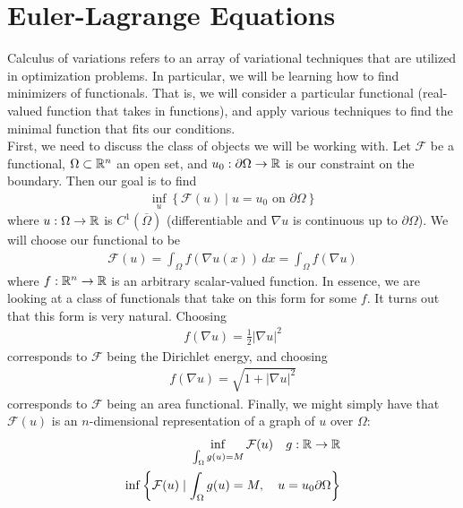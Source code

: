 \documentclass{memoir}
\begin{document}


\chapter{Euler-Lagrange Equations}
\label{cha:euler_lagrange_equations}
Calculus of variations refers to an array of variational techniques that are utilized in optimization problems. In particular, we will be learning how to find minimizers of functionals. That is, we will consider a particular functional (real-valued function that takes in functions), and apply various techniques to find the minimal function that fits our conditions.\\

First, we need to discuss the class of objects we will be working with. Let \(\mathcal{F}\) be a functional, \(\Omega \subset \mathbb{R}^{n}\) an open set, and \(u_0: \partial\Omega \to \mathbb{R}\) is our constraint on the boundary. Then our goal is to find
\begin{align*}
	\inf_{u} \left\{\mathcal{F}(u) \mid u=u_0 \text{ on } \partial\Omega  \right\}
\end{align*}
where \(u:\Omega  \to \mathbb{R}\) is \(C^{1}(\overline{\Omega })\) (differentiable and \(\nabla u\) is continuous up to \(\partial \Omega \)). We will choose our functional to be
\begin{align*}
	\mathcal{F}(u) = \int_{\Omega }f(\nabla u(x)) \,d x = \int_\Omega f(\nabla u)
\end{align*}
where \(f:\mathbb{R}^{n}\to \mathbb{R}\) is an arbitrary scalar-valued function. In essence, we are looking at a class of functionals that take on this form for some \(f\). It turns out that this form is very natural. Choosing
\begin{align*}
	f(\nabla u) = \frac{1}{2} \left| \nabla u \right|^2
\end{align*}
corresponds to \(\mathcal{F}\) being the Dirichlet energy, and choosing
\begin{align*}
	f(\nabla u) = \sqrt{1 + \left| \nabla u \right|^2}
\end{align*}
corresponds to \(\mathcal{F}\) being an area functional. Finally, we might simply have that \(\mathcal{F}(u)\) is an \(n\)-dimensional representation of a graph of \(u\) over \(\Omega \):
\begin{align*}
	\inf_{\int_\Omega  g(u) = M} \mathcal{F}(u) \quad g:\mathbb{R}\to \mathbb{R}\\
	\inf \left\{\mathcal{F}(u) \mid \int_{\Omega }g(u) = M, \quad u = u_0 \partial \Omega  \right\} 
\end{align*}
\end{document}
